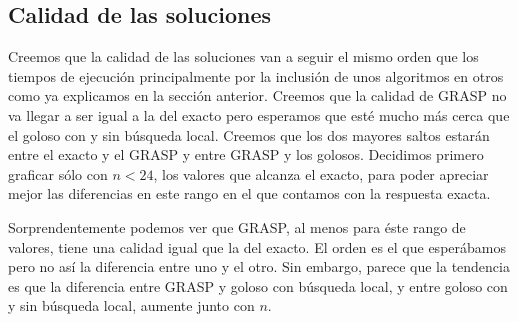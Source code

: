 \subsection{Calidad de las soluciones}
Creemos que la calidad de las soluciones van a seguir el mismo orden que los tiempos de ejecución
principalmente por la inclusión de unos algoritmos en otros como ya explicamos en la sección anterior.
Creemos que la calidad de GRASP no va llegar a ser igual a la del exacto pero esperamos
que esté mucho más cerca que el goloso con y sin búsqueda local. Creemos que los dos mayores saltos
estarán entre el exacto y el GRASP y entre GRASP y los golosos.
Decidimos primero graficar sólo con $n < 24$, los valores que alcanza el exacto, para poder apreciar
mejor las diferencias en este rango en el que contamos con la respuesta exacta.
\begin{figure}[H]
    \begin{minipage}[t]{\linewidth}
		\centering
		\label{fig:ejercicio-6-comparacion-calidad}
    \end{minipage}
\end{figure}

Sorprendentemente podemos ver que GRASP, al menos para éste rango de valores, tiene una calidad
igual que la del exacto. El orden es el que esperábamos pero no así la diferencia entre uno y el otro.
Sin embargo, parece que la tendencia es que la diferencia entre GRASP y goloso con búsqueda local, y
entre goloso con y sin búsqueda local, aumente junto con $n$.

